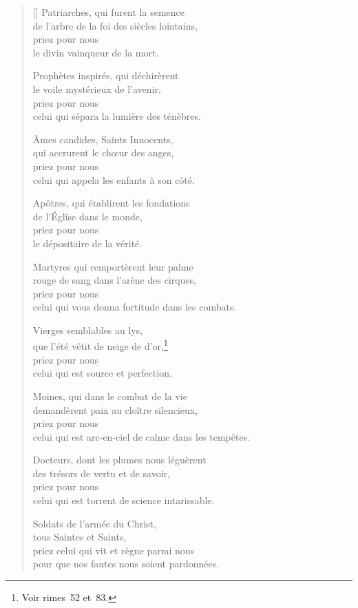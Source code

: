 \documentclass[a4paper,12pt]{book}
\begin{document}
\settowidth{\versewidth}{celui qui est arc-en-ciel de calme dans les tempêtes.}


\begin{verse}[\versewidth]
  Patriarches, qui furent la semence \\
  de l'arbre de la foi des siècles lointains, \\
  priez pour nous \\
  le divin vainqueur de la mort.

  Prophètes inspirés, qui déchirèrent \\
  le voile mystérieux de l'avenir, \\
  priez pour nous \\
  celui qui sépara la lumière des ténèbres.

  Âmes candides, Saints Innocents, \\
  qui accrurent le chœur des anges, \\
  priez pour nous \\
  celui qui appela les enfants à son côté.

  Apôtres, qui établirent les fondations \\
  de l'Église dans le monde, \\
  priez pour nous \\
  le dépositaire de la vérité.

  Martyres qui remportèrent leur palme \\
  rouge de sang dans l'arène des cirques, \\
  priez pour nous \\
  celui qui vous donna fortitude dans les combats.

  Vierges semblables au lys, \\
  que l'été vêtit de neige de d'or,\footnote{Voir rimes~52 et~83.} \\
  priez pour nous \\
  celui qui est source et perfection.

  Moines, qui dans le combat de la vie \\
  demandèrent paix au cloître silencieux, \\
  priez pour nous \\
  celui qui est arc-en-ciel de calme dans les tempêtes.

  Docteurs, dont les plumes nous léguèrent \\
  des trésors de vertu et de savoir, \\
  priez pour nous \\
  celui qui est torrent de science intarissable.

  Soldats de l'armée du Christ, \\
  tous Saintes et Saints, \\
  priez celui qui vit et règne parmi nous \\
  pour que nos fautes nous soient pardonnées.
\end{verse}
\end{document}
